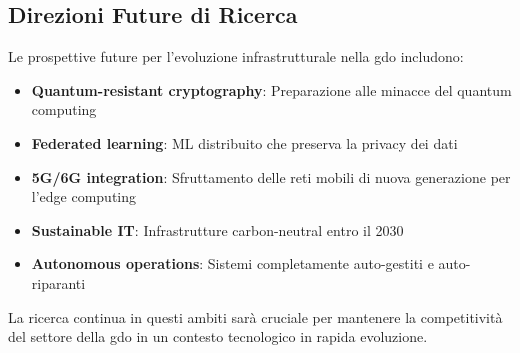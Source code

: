 \subsection{Direzioni Future di Ricerca}
\label{subsec:future_research}

Le prospettive future per l'evoluzione infrastrutturale nella \gls{gdo} includono:

\begin{itemize}
    \item \textbf{Quantum-resistant cryptography}: Preparazione alle minacce del quantum computing
    \item \textbf{Federated learning}: ML distribuito che preserva la privacy dei dati
    \item \textbf{5G/6G integration}: Sfruttamento delle reti mobili di nuova generazione per l'edge computing
    \item \textbf{Sustainable IT}: Infrastrutture carbon-neutral entro il 2030
    \item \textbf{Autonomous operations}: Sistemi completamente auto-gestiti e auto-riparanti
\end{itemize}

La ricerca continua in questi ambiti sarà cruciale per mantenere la competitività del settore della \gls{gdo} in un contesto tecnologico in rapida evoluzione.

\clearpage
\printbibliography[
    heading=subbibliography,
    title={Riferimenti Bibliografici del Capitolo 3},
]


\clearpage
